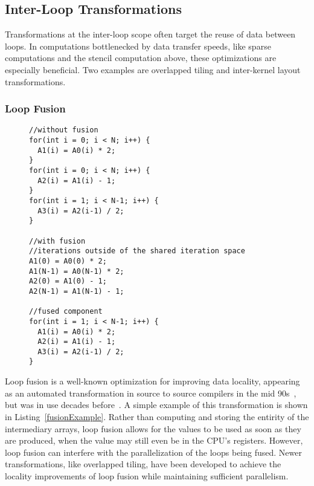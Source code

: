 \subsection{Inter-Loop Transformations}
Transformations at the inter-loop scope often target the reuse of data between loops.
In computations bottlenecked by data transfer speeds, like sparse computations and the stencil computation above, these optimizations are especially beneficial. 
Two examples are overlapped tiling and inter-kernel layout transformations.

\subsubsection{Loop Fusion}
\begin{figure}
\begin{lstlisting}[caption={Three loops, with and without loop fusion.},label=fusionExample]
//without fusion
for(int i = 0; i < N; i++) {
  A1(i) = A0(i) * 2;
}
for(int i = 0; i < N; i++) {
  A2(i) = A1(i) - 1;
}
for(int i = 1; i < N-1; i++) {
  A3(i) = A2(i-1) / 2;
}

//with fusion
//iterations outside of the shared iteration space
A1(0) = A0(0) * 2;
A1(N-1) = A0(N-1) * 2;
A2(0) = A1(0) - 1;
A2(N-1) = A1(N-1) - 1;

//fused component
for(int i = 1; i < N-1; i++) {
  A1(i) = A0(i) * 2;
  A2(i) = A1(i) - 1;
  A3(i) = A2(i-1) / 2;
}
\end{lstlisting}
\end{figure}

Loop fusion is a well-known optimization for improving data locality, appearing as an automated transformation in source to source compilers in the mid 90s~\cite{mckinley1996improving}, but was in use decades before~\cite{warren1984hierarchical,thomas1971catalogue}.
A simple example of this transformation is shown in Listing~\ref{fusionExample}.
Rather than computing and storing the entirity of the intermediary arrays, loop fusion allows for the values to be used as soon as they are produced, when the value may still even be in the CPU's registers.
However, loop fusion can interfere with the parallelization of the loops being fused.
Newer transformations, like overlapped tiling, have been developed to achieve the locality improvements of loop fusion while maintaining sufficient parallelism.

